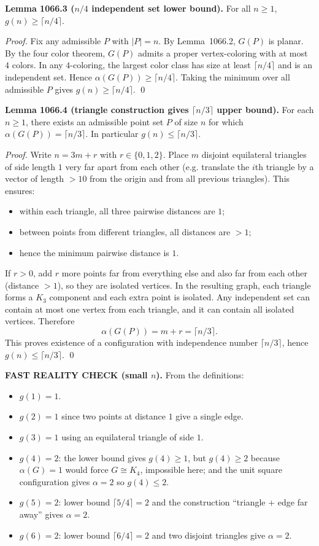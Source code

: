 \textbf{Lemma 1066.3 ($n/4$ independent set lower bound).}
For all $n\ge 1$, $g(n)\ge \lceil n/4\rceil$.

\emph{Proof.}
Fix any admissible $P$ with $|P|=n$. By Lemma~1066.2, $G(P)$ is planar. By the four color theorem, $G(P)$ admits a proper vertex-coloring with at most $4$ colors.  In any $4$-coloring, the largest color class has size at least $\lceil n/4\rceil$ and is an independent set. Hence $\alpha(G(P))\ge \lceil n/4\rceil$.  Taking the minimum over all admissible $P$ gives $g(n)\ge \lceil n/4\rceil$. \qed

\textbf{Lemma 1066.4 (triangle construction gives $\lceil n/3\rceil$ upper bound).}
For each $n\ge 1$, there exists an admissible point set $P$ of size $n$ for which $\alpha(G(P))=\lceil n/3\rceil$. In particular $g(n)\le \lceil n/3\rceil$.

\emph{Proof.}
Write $n=3m+r$ with $r\in\{0,1,2\}$. Place $m$ disjoint equilateral triangles of side length $1$ very far apart from each other (e.g. translate the $i$th triangle by a vector of length $>10$ from the origin and from all previous triangles). This ensures:
\begin{itemize}
\item within each triangle, all three pairwise distances are $1$;
\item between points from different triangles, all distances are $>1$;
\item hence the minimum pairwise distance is $1$.
\end{itemize}
If $r>0$, add $r$ more points far from everything else and also far from each other (distance $>1$), so they are isolated vertices.
In the resulting graph, each triangle forms a $K_3$ component and each extra point is isolated.  Any independent set can contain at most one vertex from each triangle, and it can contain all isolated vertices. Therefore
\[
\alpha(G(P)) = m + r = \lceil n/3\rceil.
\]
This proves existence of a configuration with independence number $\lceil n/3\rceil$, hence $g(n)\le \lceil n/3\rceil$. \qed

\textbf{FAST REALITY CHECK (small $n$).}
From the definitions:
\begin{itemize}
\item $g(1)=1$.
\item $g(2)=1$ since two points at distance $1$ give a single edge.
\item $g(3)=1$ using an equilateral triangle of side $1$.
\item $g(4)=2$: the lower bound gives $g(4)\ge 1$, but $g(4)\ge 2$ because $\alpha(G)=1$ would force $G\cong K_4$, impossible here; and the unit square configuration gives $\alpha=2$ so $g(4)\le 2$.
\item $g(5)=2$: lower bound $\lceil 5/4\rceil=2$ and the construction ``triangle + edge far away'' gives $\alpha=2$.
\item $g(6)=2$: lower bound $\lceil 6/4\rceil=2$ and two disjoint triangles give $\alpha=2$.
\end{itemize}

